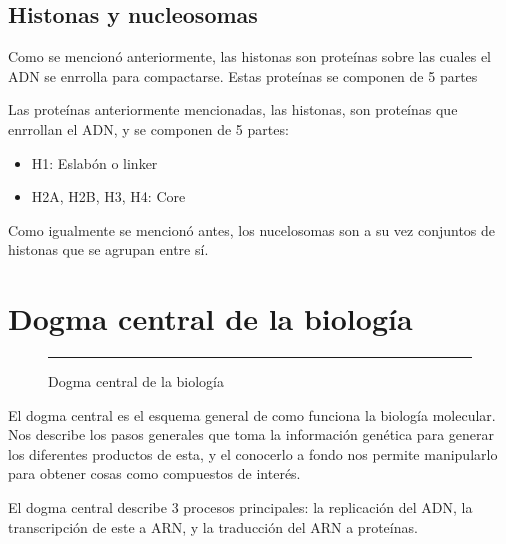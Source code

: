 \subsection{Histonas y nucleosomas}

Como se mencionó anteriormente, las histonas son proteínas sobre las cuales el ADN se enrrolla para compactarse. Estas proteínas se componen de 5 partes 

Las proteínas anteriormente mencionadas, las histonas, son proteínas que enrrollan el ADN, y se componen de 5 partes:

\begin{itemize}
    \item H1: Eslabón o linker
    \item H2A, H2B, H3, H4: Core
\end{itemize}

Como igualmente se mencionó antes, los nucelosomas son a su vez conjuntos de histonas que se agrupan entre sí.



\section{Dogma central de la biología}

\begin{figure}[H]\centering
    \resizebox{\linewidth}{!}{}
    \rule{\linewidth}{0.5pt}
    \caption{Dogma central de la biología}
    \label{fig:dogma_central}
\end{figure}

El dogma central es el esquema general de como funciona la biología molecular. Nos describe los pasos generales que toma la información genética para generar los diferentes productos de esta, y el conocerlo a fondo nos permite manipularlo para obtener cosas como compuestos de interés.

El dogma central describe 3 procesos principales: la replicación del ADN, la transcripción de este a ARN, y la traducción del ARN a proteínas.  